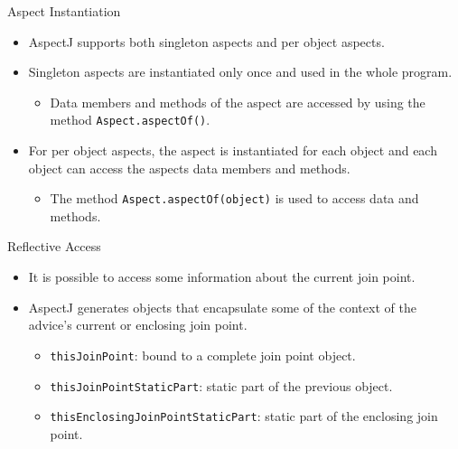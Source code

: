 \documentclass[11pt]{beamer}
\begin{document}
\begin{frame}{Aspect Instantiation}
   \begin{itemize}
      \item AspectJ supports both singleton aspects and per object aspects.
      \item Singleton aspects are instantiated only once and used in the whole program.
      \begin{itemize}
         \item Data members and methods of the aspect are accessed by using the method \texttt{Aspect.aspectOf()}.
      \end{itemize}
      \item For per object aspects, the aspect is instantiated for each object and each object can access the aspects data members and methods.
      \begin{itemize}
         \item The method \texttt{Aspect.aspectOf(object)} is used to access data and methods.
      \end{itemize}
   \end{itemize}
\end{frame}

\begin{frame}{Reflective Access}
   \begin{itemize}
      \item It is possible to access some information about the current join point.
      \item AspectJ generates objects that encapsulate some of the context of the advice's current or enclosing join point.
      \begin{itemize}
         \item \texttt{thisJoinPoint}: bound to a complete join point object.
         \item \texttt{thisJoinPointStaticPart}: static part of the previous object.
         \item \texttt{thisEnclosingJoinPointStaticPart}: static part of the enclosing join point.
      \end{itemize}
   \end{itemize}
\end{frame}
\end{document}
